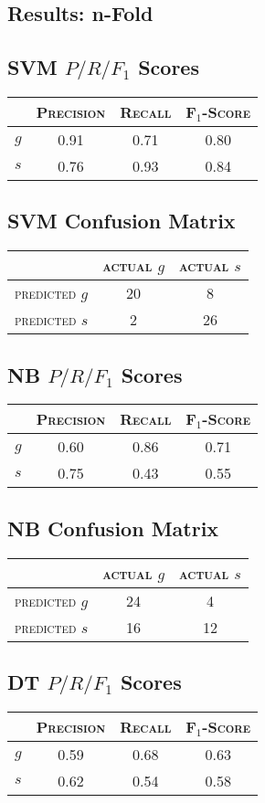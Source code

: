 \begin{multicols}{2}
\section{Results: n-Fold}
\subsection{SVM $P/R/F_1$ Scores}
\begin{tabular}{ c | c  c  c }
	& \textsc{Precision} & \textsc{Recall} & \textsc{F$_1$-Score} \\
	\hline
	\textsc{$g$} 	& 0.91 & 0.71 & 0.80 \\
	\textsc{$s$}	& 0.76 & 0.93 & 0.84
\end{tabular}
\subsection{SVM Confusion Matrix}
\begin{tabular}{ c | c  c }
	 & \textsc{actual $g$} & \textsc{actual $s$} \\
	\hline
	\textsc{predicted $g$} 	& 20 & 8 \\
	\textsc{predicted $s$}		& 2 & 26
\end{tabular}
\subsection{NB $P/R/F_1$ Scores}
\begin{tabular}{ c | c  c  c }
	& \textsc{Precision} & \textsc{Recall} & \textsc{F$_1$-Score} \\
	\hline
	\textsc{$g$} 	& 0.60 & 0.86 & 0.71 \\
	\textsc{$s$}	& 0.75 & 0.43 & 0.55
\end{tabular}
\subsection{NB Confusion Matrix}
\begin{tabular}{ c | c  c }
	 & \textsc{actual $g$} & \textsc{actual $s$} \\
	\hline
	\textsc{predicted $g$} 	& 24 & 4 \\
	\textsc{predicted $s$}		& 16 & 12
\end{tabular}
\subsection{DT $P/R/F_1$ Scores}
\begin{tabular}{ c | c  c  c }
	& \textsc{Precision} & \textsc{Recall} & \textsc{F$_1$-Score} \\
	\hline
	\textsc{$g$} 	& 0.59 & 0.68 & 0.63 \\
	\textsc{$s$}	& 0.62 & 0.54 & 0.58
\end{tabular}

\end{multicols}
